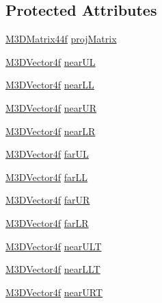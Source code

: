 \subsection*{Protected Attributes}
\begin{DoxyCompactItemize}
\item 
\hyperlink{math3d_8h_a1e8690467d81d5ed97c5ecc3a144a4ac}{M3\-D\-Matrix44f} \hyperlink{class_g_l_frustum_a318a8b78ec8c4bb39b44d1068e3d858e}{proj\-Matrix}
\item 
\hyperlink{math3d_8h_a7da2e6b342ba064a875bf5bfc5dadb6f}{M3\-D\-Vector4f} \hyperlink{class_g_l_frustum_a1b577bcf56bc6251bbec0c88d2f552e4}{near\-U\-L}
\item 
\hyperlink{math3d_8h_a7da2e6b342ba064a875bf5bfc5dadb6f}{M3\-D\-Vector4f} \hyperlink{class_g_l_frustum_a3fb95dabc5be223d79248cff485caa72}{near\-L\-L}
\item 
\hyperlink{math3d_8h_a7da2e6b342ba064a875bf5bfc5dadb6f}{M3\-D\-Vector4f} \hyperlink{class_g_l_frustum_ac160cfff393ad6691577b10984ad7bee}{near\-U\-R}
\item 
\hyperlink{math3d_8h_a7da2e6b342ba064a875bf5bfc5dadb6f}{M3\-D\-Vector4f} \hyperlink{class_g_l_frustum_a7c1ec477fc6c3c830e7282a5930a74f1}{near\-L\-R}
\item 
\hyperlink{math3d_8h_a7da2e6b342ba064a875bf5bfc5dadb6f}{M3\-D\-Vector4f} \hyperlink{class_g_l_frustum_adef779d9dba59c6a6f901166defff67c}{far\-U\-L}
\item 
\hyperlink{math3d_8h_a7da2e6b342ba064a875bf5bfc5dadb6f}{M3\-D\-Vector4f} \hyperlink{class_g_l_frustum_ac2322ee21830b8d7aac70e05dc24660b}{far\-L\-L}
\item 
\hyperlink{math3d_8h_a7da2e6b342ba064a875bf5bfc5dadb6f}{M3\-D\-Vector4f} \hyperlink{class_g_l_frustum_a4f7e751b70f2df44c45339aab4a23fee}{far\-U\-R}
\item 
\hyperlink{math3d_8h_a7da2e6b342ba064a875bf5bfc5dadb6f}{M3\-D\-Vector4f} \hyperlink{class_g_l_frustum_a7484d94df8694846ce1491e2d2388acc}{far\-L\-R}
\item 
\hyperlink{math3d_8h_a7da2e6b342ba064a875bf5bfc5dadb6f}{M3\-D\-Vector4f} \hyperlink{class_g_l_frustum_aee355a8ff715b43dafb158d08680e52d}{near\-U\-L\-T}
\item 
\hyperlink{math3d_8h_a7da2e6b342ba064a875bf5bfc5dadb6f}{M3\-D\-Vector4f} \hyperlink{class_g_l_frustum_a5f228145759f233b2dcea16b2c52e693}{near\-L\-L\-T}
\item 
\hyperlink{math3d_8h_a7da2e6b342ba064a875bf5bfc5dadb6f}{M3\-D\-Vector4f} \hyperlink{class_g_l_frustum_a6f67e8ff610896911187d9cc62dadc72}{near\-U\-R\-T}

\end{DoxyCompactItemize}
